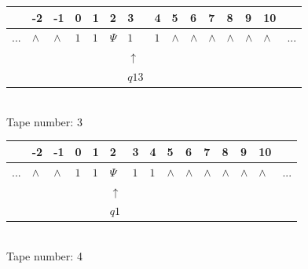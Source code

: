 \documentclass[11pt]{article}
\begin{document}
\begin{table}[H]
\centering
\begin{tabular}{lllllllllllllll}
 & -2 & -1 & 0 & 1 & 2 & 3 & 4 & 5 & 6 & 7 & 8 & 9 & 10 & \\
\hline
$...$ & \multicolumn{1}{|l|}{$\wedge$} & \multicolumn{1}{|l|}{$\wedge$} & \multicolumn{1}{|l|}{$1$} & \multicolumn{1}{|l|}{$1$} & \multicolumn{1}{|l|}{$\Psi$} & \multicolumn{1}{|l|}{$1$} & \multicolumn{1}{|l|}{$1$} & \multicolumn{1}{|l|}{$\wedge$} & \multicolumn{1}{|l|}{$\wedge$} & \multicolumn{1}{|l|}{$\wedge$} & \multicolumn{1}{|l|}{$\wedge$} & \multicolumn{1}{|l|}{$\wedge$} & \multicolumn{1}{|l|}{$\wedge$} & $...$\\
\hline
&  &  &  &  &  & $\uparrow$ &  &  &  &  &  &  &  &  \\
&  &  &  &  &  & $ q13 $ &  &  &  &  &  &  &  &  \\
\end{tabular}
\\
Tape number: 3
\noindent\makebox[\linewidth]{\hdashrule{\textwidth}{1pt}{1pt}}\end{table}

\begin{table}[H]
\centering
\begin{tabular}{lllllllllllllll}
 & -2 & -1 & 0 & 1 & 2 & 3 & 4 & 5 & 6 & 7 & 8 & 9 & 10 & \\
\hline
$...$ & \multicolumn{1}{|l|}{$\wedge$} & \multicolumn{1}{|l|}{$\wedge$} & \multicolumn{1}{|l|}{$1$} & \multicolumn{1}{|l|}{$1$} & \multicolumn{1}{|l|}{$\Psi$} & \multicolumn{1}{|l|}{$1$} & \multicolumn{1}{|l|}{$1$} & \multicolumn{1}{|l|}{$\wedge$} & \multicolumn{1}{|l|}{$\wedge$} & \multicolumn{1}{|l|}{$\wedge$} & \multicolumn{1}{|l|}{$\wedge$} & \multicolumn{1}{|l|}{$\wedge$} & \multicolumn{1}{|l|}{$\wedge$} & $...$\\
\hline
&  &  &  &  & $\uparrow$ &  &  &  &  &  &  &  &  &  \\
&  &  &  &  & $ q1 $ &  &  &  &  &  &  &  &  &  \\
\end{tabular}
\\
Tape number: 4
\noindent\makebox[\linewidth]{\hdashrule{\textwidth}{1pt}{1pt}}\end{table}
\end{document}
